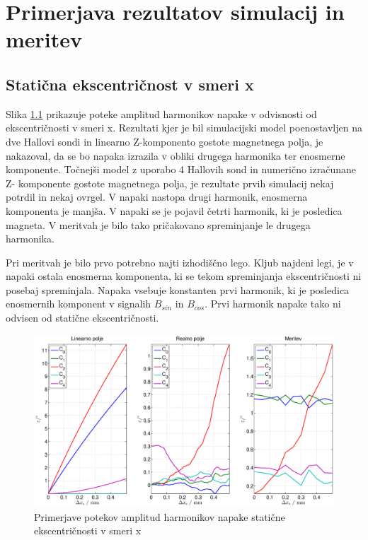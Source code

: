 \chapter{Primerjava rezultatov simulacij in meritev}
\section{Statična ekscentričnost v smeri x}
Slika \ref{primerjava_xs} prikazuje poteke amplitud harmonikov napake v odvisnosti od ekscentričnosti v smeri x. 
Rezultati kjer je bil simulacijski model poenostavljen na dve Hallovi sondi in linearno Z-komponento gostote magnetnega polja, je nakazoval, da se bo napaka izrazila v obliki drugega harmonika ter enosmerne komponente.
Točnejši model z uporabo 4 Hallovih sond in numerično izračunane Z- komponente gostote magnetnega polja, je rezultate prvih simulacij nekaj potrdil in nekaj ovrgel. V napaki nastopa drugi harmonik, enosmerna komponenta je manjša. V napaki se je pojavil četrti harmonik, ki je posledica magneta. V meritvah je bilo tako pričakovano spreminjanje le drugega harmonika.

Pri meritvah je bilo prvo potrebno najti izhodiščno  lego. Kljub najdeni legi, je v napaki ostala enosmerna komponenta, ki se tekom spreminjanja ekscentričnosti ni posebaj spreminjala. Napaka vsebuje konstanten prvi harmonik, ki je posledica enosmernih komponent v signalih $B_{sin}$ in $B_{cos}$. Prvi harmonik napake tako ni odvisen od statične ekscentričnosti.
\begin{figure}[ht]
	\centering
	\includegraphics[width=\columnwidth]{./Slike/primerjava_xs.eps}
	\caption{Primerjave potekov amplitud harmonikov napake  statične ekscentričnosti v smeri x}
	\label{primerjava_xs}
\end{figure}
